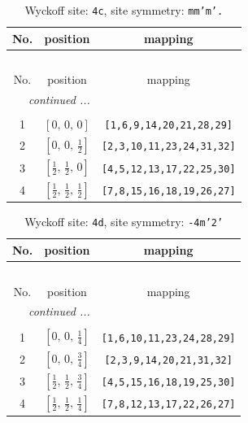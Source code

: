 \documentclass[fleqn,8pt]{jsarticle}
\begin{document}
\renewcommand{\arraystretch}{1.2}
\begin{longtable}{ccc}
\caption{Wyckoff site: {\tt 4c}, site symmetry: {\tt mm'm'.}}
 \\
 \hline \hline
No. & position & mapping \\ \hline \endfirsthead

\multicolumn{2}{l}{\tablename\ \thetable{}} \\
 \hline \hline
No. & position & mapping \\ \hline \endhead

 \hline \hline
\multicolumn{2}{r}{\footnotesize\it continued ...} \\ \endfoot

 \hline \hline
\multicolumn{2}{r}{} \\ \endlastfoot

1 & $\left[ 0,\, 0,\, 0 \right]$ & {\tt [1,6,9,14,20,21,28,29]} \\ \hline
2 & $\left[ 0,\, 0,\, \frac{1}{2} \right]$ & {\tt [2,3,10,11,23,24,31,32]} \\ \hline
3 & $\left[ \frac{1}{2},\, \frac{1}{2},\, 0 \right]$ & {\tt [4,5,12,13,17,22,25,30]} \\ \hline
4 & $\left[ \frac{1}{2},\, \frac{1}{2},\, \frac{1}{2} \right]$ & {\tt [7,8,15,16,18,19,26,27]} \\
\end{longtable}
\renewcommand{\arraystretch}{1.2}
\begin{longtable}{ccc}
\caption{Wyckoff site: {\tt 4d}, site symmetry: {\tt -4m'2'}}
 \\
 \hline \hline
No. & position & mapping \\ \hline \endfirsthead

\multicolumn{2}{l}{\tablename\ \thetable{}} \\
 \hline \hline
No. & position & mapping \\ \hline \endhead

 \hline \hline
\multicolumn{2}{r}{\footnotesize\it continued ...} \\ \endfoot

 \hline \hline
\multicolumn{2}{r}{} \\ \endlastfoot

1 & $\left[ 0,\, 0,\, \frac{1}{4} \right]$ & {\tt [1,6,10,11,23,24,28,29]} \\ \hline
2 & $\left[ 0,\, 0,\, \frac{3}{4} \right]$ & {\tt [2,3,9,14,20,21,31,32]} \\ \hline
3 & $\left[ \frac{1}{2},\, \frac{1}{2},\, \frac{3}{4} \right]$ & {\tt [4,5,15,16,18,19,25,30]} \\ \hline
4 & $\left[ \frac{1}{2},\, \frac{1}{2},\, \frac{1}{4} \right]$ & {\tt [7,8,12,13,17,22,26,27]} \\
\end{longtable}
\end{document}
